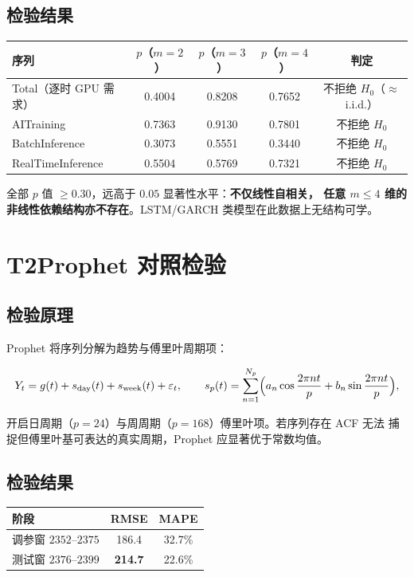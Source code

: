 \documentclass{internal-report}
\begin{document}
\subsection{检验结果}

\begin{center}
\footnotesize
\begin{tabular}{lcccc}
\toprule
序列 & $p$（$m=2$） & $p$（$m=3$） & $p$（$m=4$） & 判定 \\
\midrule
Total（逐时 GPU 需求） & 0.4004 & 0.8208 & 0.7652 & 不拒绝 $H_0$（$\approx$ i.i.d.） \\
AITraining & 0.7363 & 0.9130 & 0.7801 & 不拒绝 $H_0$ \\
BatchInference & 0.3073 & 0.5551 & 0.3440 & 不拒绝 $H_0$ \\
RealTimeInference & 0.5504 & 0.5769 & 0.7321 & 不拒绝 $H_0$ \\
\bottomrule
\end{tabular}
\end{center}

全部 $p$ 值 $\ge 0.30$，远高于 $0.05$ 显著性水平：\textbf{不仅线性自相关，
任意 $m\le 4$ 维的非线性依赖结构亦不存在}。LSTM/GARCH 类模型在此数据上无结构可学。

\section{T2\quad Prophet 对照检验}

\subsection{检验原理}

Prophet 将序列分解为趋势与傅里叶周期项：

\begin{equation}
  Y_t = g(t) + s_{\text{day}}(t) + s_{\text{week}}(t) + \varepsilon_t,
  \qquad s_p(t) = \sum_{n=1}^{N_p}\Bigl(a_n\cos\frac{2\pi n t}{p} + b_n\sin\frac{2\pi n t}{p}\Bigr),
  \label{eq:prophet}
\end{equation}

开启日周期（$p=24$）与周周期（$p=168$）傅里叶项。若序列存在 ACF 无法
捕捉但傅里叶基可表达的真实周期，Prophet 应显著优于常数均值。

\subsection{检验结果}

\begin{center}
\begin{tabular}{lcc}
\toprule
阶段 & RMSE & MAPE \\
\midrule
调参窗 $2352$--$2375$ & 186.4 & 32.7\% \\
测试窗 $2376$--$2399$ & \textbf{214.7} & 22.6\% \\
\bottomrule
\end{tabular}
\end{center}
\end{document}
